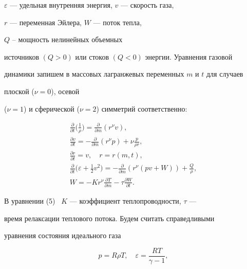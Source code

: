 $\varepsilon$ --- удельная внутренняя энергия, $v$ --- скорость газа,


$r$ --- переменная Эйлера, $W$ --- поток тепла,


$Q$ -- мощность нелинейных объемных


источников $(Q > 0)$ или стоков $(Q < 0)$ энергии. Уравнения газовой 


динамики запишем в массовых лагранжевых переменных $m$ и $t$ для случаев 


плоской ($\nu = 0$), осевой


($\nu = 1$) и сферической ($\nu = 2$) симметрий соответственно:


\begin{gather}


\frac {\partial}{\partial t}\bigg(\frac {1}{\rho}\bigg)=


\frac {\partial}{\partial m}(r^{\nu} v ),\\


%


\frac {\partial { v }}{\partial t}= - \frac


{\partial}{\partial m}(r^{\nu}p)+\nu\frac{p}{\rho r},\\


%


\frac {\partial r}{\partial t} = v,\quad r=r(m,t),\\


%


\frac {\partial}{\partial


t}\bigg(\varepsilon+\frac{1}{2} v ^2\bigg)= -\frac {\partial}{\partial


m}(r^{\nu}(p v +W))+\frac{Q}{\rho},\\


%


W=-Kr^{\nu} \frac {\partial T}{\partial m}-\tau


\frac {\partial W} {\partial t}.


\end{gather}





В уравнении (5) \ $K$ --- коэффициент теплопроводности, $\tau$ ---


время релаксации теплового потока. Будем считать справедливыми


уравнения состояния идеального газа


\begin{equation}


p = R {\rho} T,\quad {\varepsilon} = \frac {RT}{\gamma - 1},


\end{equation}



